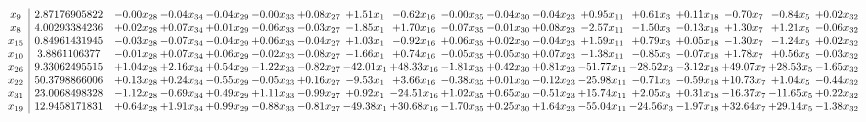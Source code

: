 \documentclass[9pt]{article}
\begin{document}
 \[\begin{array}{c| c c@{\hskip 2pt} c@{\hskip 2pt} c@{\hskip 2pt} c@{\hskip 2pt} c@{\hskip 2pt} c@{\hskip 2pt} c@{\hskip 2pt} c@{\hskip 2pt} c@{\hskip 2pt} c@{\hskip 2pt} c@{\hskip 2pt} c@{\hskip 2pt} c@{\hskip 2pt} c@{\hskip 2pt} c@{\hskip 2pt} c@{\hskip 2pt} }
 x_{9}   &  2.87176905822 & -0.00 x_{28} & -0.04 x_{34} & -0.04 x_{29} & -0.00 x_{33} & +  0.08 x_{27} & +  1.51 x_{1} & -0.62 x_{16} & -0.00 x_{35} & -0.04 x_{30} & -0.04 x_{23} & +  0.95 x_{11} & +  0.61 x_{3} & +  0.11 x_{18} & -0.70 x_{7} & -0.84 x_{5} & +  0.02 x_{32}\\
 x_{8}   &  4.00293384236 & +  0.02 x_{28} & +  0.07 x_{34} & +  0.01 x_{29} & -0.06 x_{33} & -0.03 x_{27} & -1.85 x_{1} & +  1.70 x_{16} & -0.07 x_{35} & -0.01 x_{30} & +  0.08 x_{23} & -2.57 x_{11} & -1.50 x_{3} & -0.13 x_{18} & +  1.30 x_{7} & +  1.21 x_{5} & -0.06 x_{32}\\
 x_{15}   &  0.84961431945 & -0.03 x_{28} & -0.07 x_{34} & -0.04 x_{29} & +  0.06 x_{33} & -0.04 x_{27} & +  1.03 x_{1} & -0.92 x_{16} & +  0.06 x_{35} & +  0.02 x_{30} & -0.04 x_{23} & +  1.59 x_{11} & +  0.79 x_{3} & +  0.05 x_{18} & -1.30 x_{7} & -1.24 x_{5} & +  0.02 x_{32}\\
 x_{10}   &  3.8861106377 & -0.01 x_{28} & +  0.07 x_{34} & +  0.06 x_{29} & -0.02 x_{33} & -0.08 x_{27} & -1.66 x_{1} & +  0.74 x_{16} & -0.05 x_{35} & +  0.05 x_{30} & +  0.07 x_{23} & -1.38 x_{11} & -0.85 x_{3} & -0.07 x_{18} & +  1.78 x_{7} & +  0.56 x_{5} & -0.03 x_{32}\\
 x_{26}   &  9.33062495515 & +  1.04 x_{28} & +  2.16 x_{34} & +  0.54 x_{29} & -1.22 x_{33} & -0.82 x_{27} & -42.01 x_{1} & + 48.33 x_{16} & -1.81 x_{35} & +  0.42 x_{30} & +  0.81 x_{23} & -51.77 x_{11} & -28.52 x_{3} & -3.12 x_{18} & + 49.07 x_{7} & + 28.53 x_{5} & -1.65 x_{32}\\
 x_{22}   &  50.3798866006 & +  0.13 x_{28} & +  0.24 x_{34} & -0.55 x_{29} & -0.05 x_{33} & +  0.16 x_{27} & -9.53 x_{1} & +  3.66 x_{16} & -0.38 x_{35} & +  0.01 x_{30} & -0.12 x_{23} & -25.98 x_{11} & -0.71 x_{3} & -0.59 x_{18} & + 10.73 x_{7} & +  1.04 x_{5} & -0.44 x_{32}\\
 x_{31}   &  23.0068498328 & -1.12 x_{28} & -0.69 x_{34} & +  0.49 x_{29} & +  1.11 x_{33} & -0.99 x_{27} & +  0.92 x_{1} & -24.51 x_{16} & +  1.02 x_{35} & +  0.65 x_{30} & -0.51 x_{23} & + 15.74 x_{11} & +  2.05 x_{3} & +  0.31 x_{18} & -16.37 x_{7} & -11.65 x_{5} & +  0.22 x_{32}\\
 x_{19}   &  12.9458171831 & +  0.64 x_{28} & +  1.91 x_{34} & +  0.99 x_{29} & -0.88 x_{33} & -0.81 x_{27} & -49.38 x_{1} & + 30.68 x_{16} & -1.70 x_{35} & +  0.25 x_{30} & +  1.64 x_{23} & -55.04 x_{11} & -24.56 x_{3} & -1.97 x_{18} & + 32.64 x_{7} & + 29.14 x_{5} & -1.38 x_{32}\\

\end{array}\]
\end{document}
